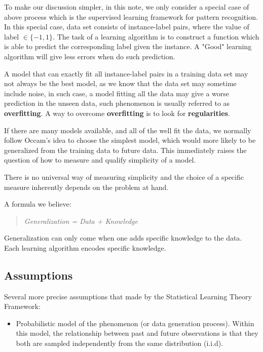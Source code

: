 \documentclass[12pt,reqno]{amsart}
\begin{document}
To make our discussion simpler, in this note, we only consider
a special case of above process which is the supervised learning 
framework for pattern recognition. In this special case, data set
consists of instance-label pairs, where the value of label $\in \{-1, 1\}$. The task of a learning algorithm is to construct a function which is able to predict the corresponding label given the instance. A "Good" learning algorithm will give less errors when do such prediction.

A model that can exactly fit all instance-label pairs in a training
data set may not always be the best model, as we know that the data set may sometime include noise, in such case, a model fitting all the data may give a worse prediction in the unseen data, such phenomenon is usually referred to as \textbf{overfitting}. A way to overcome \textbf{overfitting} is to look for \textbf{regularities}.

If there are many models available, and all of the well fit the data, we normally follow Occam's idea to choose the simplest model, which would more likely to be generalized from the training data to future data. This immediately raises the question of how to 
measure and qualify simplicity of a model.

There is no universal way of measuring simplicity and the 
choice of a specific measure inherently depends on the 
problem at hand.

A formula we believe:
\begin{quote}
	\textit{Generalization = Data + Knowledge}
\end{quote}

Generalization can only come when one adds specific knowledge to 
the data. Each learning algorithm encodes specific knowledge.

\subsection{Assumptions}
Several more precise assumptions that made by the Statistical
Learning Theory Framework:

\begin{itemize}
\item Probabilistic model of the phenomenon (or data generation process). Within this model, the relationship between past and
future observations is that they both are sampled independently
from the same distribution (i.i.d).

\end{itemize}
\end{document}
